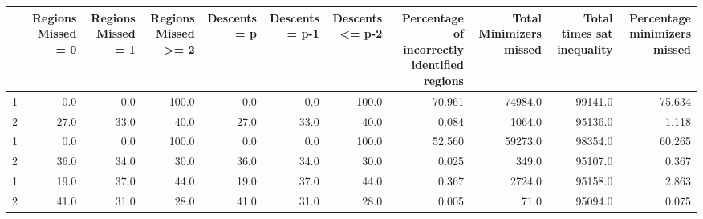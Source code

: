 \begin{tabular}{lrrrrrrrrrr}
\toprule
{} &  Regions Missed = 0 &  Regions Missed = 1 &  Regions Missed >= 2 &  Descents = p &  Descents = p-1 &  Descents <= p-2 &  Percentage of incorrectly identified regions &  Total Minimizers missed &  Total times sat inequality &  Percentage minimizers missed \\
\midrule
1 &                 0.0 &                 0.0 &                100.0 &           0.0 &             0.0 &            100.0 &                                        70.961 &                  74984.0 &                     99141.0 &                        75.634 \\
2 &                27.0 &                33.0 &                 40.0 &          27.0 &            33.0 &             40.0 &                                         0.084 &                   1064.0 &                     95136.0 &                         1.118 \\
1 &                 0.0 &                 0.0 &                100.0 &           0.0 &             0.0 &            100.0 &                                        52.560 &                  59273.0 &                     98354.0 &                        60.265 \\
2 &                36.0 &                34.0 &                 30.0 &          36.0 &            34.0 &             30.0 &                                         0.025 &                    349.0 &                     95107.0 &                         0.367 \\
1 &                19.0 &                37.0 &                 44.0 &          19.0 &            37.0 &             44.0 &                                         0.367 &                   2724.0 &                     95158.0 &                         2.863 \\
2 &                41.0 &                31.0 &                 28.0 &          41.0 &            31.0 &             28.0 &                                         0.005 &                     71.0 &                     95094.0 &                         0.075 \\
\bottomrule
\end{tabular}
